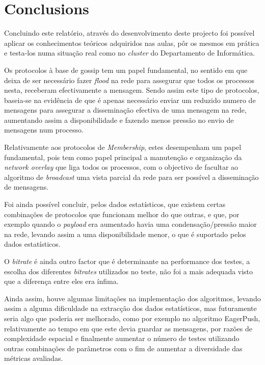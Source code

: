 \section{Conclusions}




Concluindo este relatório, através do desenvolvimento deste projecto foi possível aplicar os conhecimentos teóricos adquiridos nas aulas, pôr os mesmos em prática e testa-los numa situação real como no \textit{cluster} do Departamento de Informática.

Os protocolos à base de gossip tem um papel fundamental, no sentido em que deixa de ser necessário fazer \textit{flood} na rede para assegurar que todos os processos nesta, receberam efectivamente a mensagem. Sendo assim este tipo de protocolos, baseia-se na evidência de que é apenas necessário enviar um reduzido numero de mensagens para assegurar a disseminação efectiva de uma mensagem na rede, aumentando assim a disponibilidade e fazendo menos pressão no envio de mensagens num processo.

Relativamente aos protocolos de \textit{Membership}, estes desempenham um papel fundamental, pois tem como papel principal a manutenção e organização da \textit{network overlay} que liga todos os processos, com o objectivo de facultar ao algoritmo de \textit{broadcast} uma vista parcial da rede para ser possível a disseminação de mensagens.

Foi ainda possível concluir, pelos dados estatísticos, que existem certas combinações de protocolos que funcionam melhor do que outras, e que, por exemplo quando o \textit{payload} era aumentado havia uma condensação/pressão maior na rede, levando assim a uma disponibilidade menor, o que é suportado pelos dados estatísticos. 

O \textit{bitrate} é ainda outro factor que é determinante na performance dos testes, a escolha dos diferentes \textit{bitrates} utilizados no teste, não foi a mais adequada visto que a diferença entre eles era ínfima.

Ainda assim, houve algumas limitações na implementação dos algoritmos, levando assim a alguma dificuldade na extracção dos dados estatísticos, mas futuramente seria algo que poderia ser melhorado, como por exemplo no algoritmo EagerPush, relativamente ao tempo em que este devia guardar as mensagens, por razões de complexidade espacial e finalmente aumentar o número de testes utilizando outras combinações de parâmetros com o fim de aumentar a diversidade das métricas avaliadas.
